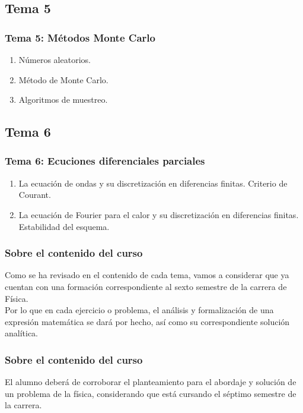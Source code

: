 \documentclass[12pt]{beamer}
\begin{document}
\subsection*{Tema 5}

\begin{frame}
\frametitle{\textbf{Tema 5: Métodos Monte Carlo}}
\begin{enumerate}[<+->]
\item Números aleatorios.
\item Método de Monte Carlo.
\item Algoritmos de muestreo.
\end{enumerate}
\end{frame}

\subsection*{Tema 6}

\begin{frame}
\frametitle{\textbf{Tema 6: Ecuciones diferenciales parciales}}
\begin{enumerate}[<+->]
\item La ecuación de ondas y su discretización en diferencias finitas. Criterio de Courant.
\item La ecuación de Fourier para el calor y su discretización en diferencias finitas. Estabilidad del esquema.
\end{enumerate}
\end{frame}
\begin{frame}
\frametitle{Sobre el contenido del curso}
Como se ha revisado en el contenido de cada tema, vamos a considerar que ya cuentan con una formación correspondiente al sexto semestre de la carrera de Física.
\\
\bigskip
\pause
Por lo que en cada ejercicio o problema, el análisis y formalización de una expresión matemática se dará por hecho, así como su correspondiente solución analítica.
\end{frame}
\begin{frame}
\frametitle{Sobre el contenido del curso}
El alumno deberá de corroborar el planteamiento para el abordaje y solución de un problema de la física, considerando que está cursando el séptimo semestre de la carrera.
\end{frame}
\end{document}
